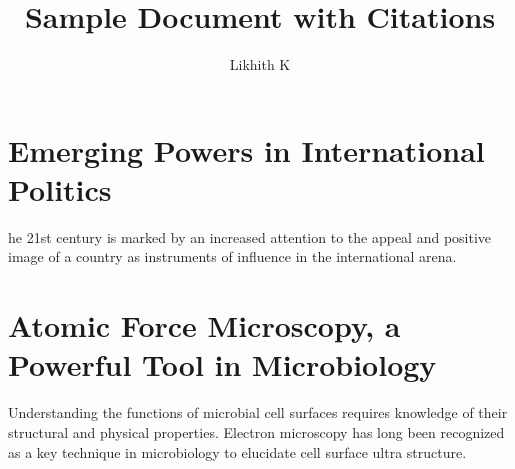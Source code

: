\documentclass{article}
\begin{document}
	
	\title{Sample Document with Citations}
	\author{Likhith K	}
	\date{}
	\maketitle
	
	\section{Emerging Powers in International Politics}
	  he 21st century is marked by an increased attention to the appeal and positive image of a country as instruments of influence in the international arena\cite{bohomolov2012ghost}.
	
	
	\section{Atomic Force Microscopy, a Powerful Tool in Microbiology}
      Understanding the functions of microbial cell surfaces requires knowledge of their structural and physical properties\cite{dufrene2002atomic}. Electron microscopy has long been recognized as a key technique in microbiology to elucidate cell surface ultra structure\cite{engel1999atomic}.
	
	
	
	
\end{document}
